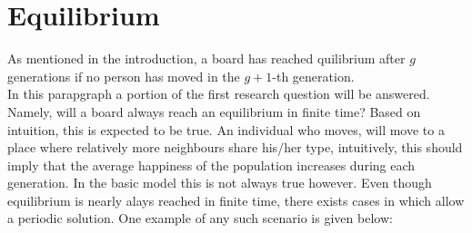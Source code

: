 
\section{Equilibrium}\label{sec:equi}
 As mentioned in the introduction, a board has reached quilibrium after $g$ generations if no  person has moved in the $g+1$-th generation.\\
In this parapgraph a portion of the first research question will be answered. Namely, will a board always reach an equilibrium in finite time? Based on intuition, this is expected to be true. An individual who moves, will move to a place where relatively more neighbours share his/her type, intuitively, this should imply that the average happiness of the population increases during each generation. In the basic model this is not always true however. Even though equilibrium is nearly alays reached in finite time, there exists cases in which allow a periodic solution. One example of any such scenario is given below:\\

